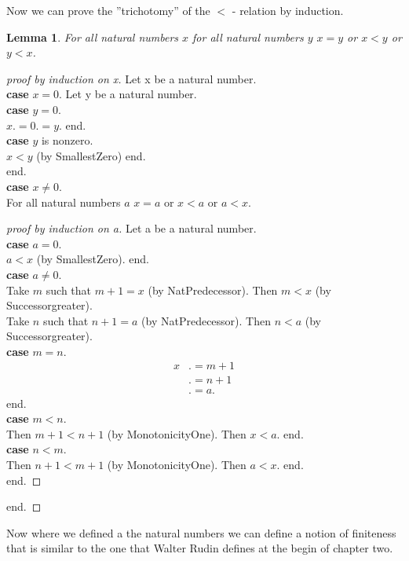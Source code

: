 \documentclass[10pt]{article}
\newenvironment{forthel}{\begin{leftbar}}{\end{leftbar}}
\theoremstyle{definition}
\theoremstyle{plain}
\newtheorem{lemma}[theorem]{Lemma}
\theoremstyle{remark}
\begin{document}
Now we can prove the ''trichotomy'' of the $<$ - relation by induction. 
\begin{forthel}
	\begin{lemma}
		For all natural numbers $x$ for all natural numbers $y$ $x=y$ or $x<y$ or $y<x$.
	\end{lemma}
	\begin{proof}[proof by induction on x]
		Let x be a natural number.\\
		\textbf{case} $x=0$. Let y be a natural number. \\
		\textbf{case} $y=0$. \\
			$x .= 0 .= y$. end. \\
		\textbf{case} $y$ is nonzero. \\
		$x<y$ (by SmallestZero) end. \\
		end. \\
		\textbf{case} $x \neq 0$. \\
		For all natural numbers $a$ $x=a$ or $x<a$ or $a<x$.
		\begin{proof}[proof by induction on a]
			Let a be a natural number. \\
			\textbf{case} $a=0$. \\
			$a<x$ (by SmallestZero). end. \\
			\textbf{case} $a\neq 0$. \\
			Take $m$ such that $m+1=x$ (by NatPredecessor). Then $m<x$ (by Successorgreater). \\
			Take $n$ such that $n+1=a$ (by NatPredecessor). Then $n<a$ (by Successorgreater). \\
			\textbf{case} $m=n$. \\
			\begin{align*}
				x &.= m+1 \\
				  &.= n+1 \\
				  &.= a.
			\end{align*}
			end. \\
			\textbf{case} $m<n$.\\
			Then $m+1 < n +1$ (by MonotonicityOne). Then $x<a$. end. \\
			\textbf{case} $n<m$. \\
			Then $n+1 < m+1$ (by MonotonicityOne). Then $a<x$. end. \\
			end.
		\end{proof}
		end.
	\end{proof}
\end{forthel}
Now where we defined a the natural numbers we can define a notion of finiteness that is similar to the one that Walter Rudin defines at the begin of chapter two.
\end{document}
